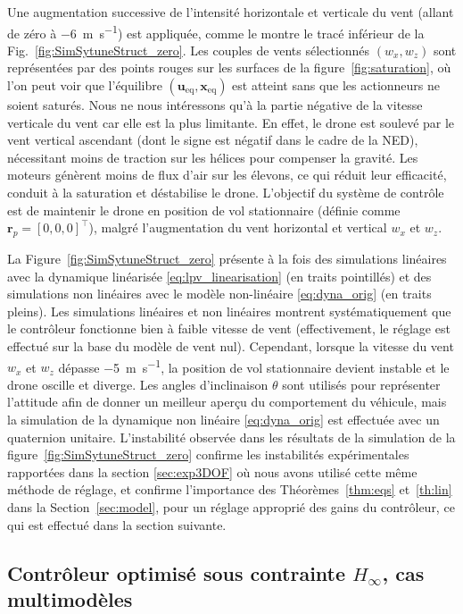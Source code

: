 Une augmentation successive de l'intensité horizontale et verticale du vent (allant de zéro à \SI{-6}{\meter\per\second}) est appliquée, comme le montre le tracé inférieur de la Fig.~\ref{fig:SimSytuneStruct_zero}. Les couples de vents sélectionnés $(w_{x}, w_{z})$ sont représentées par des points rouges sur les surfaces de la figure~\ref{fig:saturation}, où l'on peut voir que l'équilibre $(\boldsymbol{u}_{\text{eq}}, \boldsymbol{x}_{\text{eq}})$ est atteint sans que les actionneurs ne soient saturés. Nous ne nous intéressons qu'à la partie négative de la vitesse verticale du vent car elle est la plus limitante. En effet, le drone est soulevé par le vent vertical ascendant (dont le signe est négatif dans le cadre de la NED), nécessitant moins de traction sur les hélices pour compenser la gravité. Les moteurs génèrent moins de flux d'air sur les élevons, ce qui réduit leur efficacité, conduit à la saturation et déstabilise le drone.
L'objectif du système de contrôle est de maintenir le drone en position de vol stationnaire (définie comme $\boldsymbol{r}_{p} = [0,0,0]^\top$), malgré l'augmentation du vent horizontal et vertical $w_{x}$ et $w_{z}$. 


La Figure~\ref{fig:SimSytuneStruct_zero} présente à la fois des simulations linéaires avec la dynamique linéarisée \eqref{eq:lpv_linearisation} (en traits pointillés) et des simulations non linéaires avec le modèle non-linéaire \eqref{eq:dyna_orig} (en traits pleins). Les simulations linéaires et non linéaires montrent systématiquement que le contrôleur fonctionne bien à faible vitesse de vent (effectivement, le réglage est effectué sur la base du modèle de vent nul). Cependant, lorsque la vitesse du vent $w_{x}$ et $w_{z}$ dépasse \SI{-5}{\meter\per\second}, la position de vol stationnaire devient instable et le drone oscille et diverge. Les angles d'inclinaison $\theta$ sont utilisés pour représenter l'attitude afin de donner un meilleur aperçu du comportement du véhicule, mais la simulation de la dynamique non linéaire \eqref{eq:dyna_orig} est effectuée avec un quaternion unitaire. L'instabilité observée dans les résultats de la simulation de la figure~\ref{fig:SimSytuneStruct_zero} confirme les instabilités expérimentales rapportées dans la section \ref{sec:exp3DOF} où nous avons utilisé cette même méthode de réglage, et confirme l'importance des Théorèmes~\ref{thm:eqs} et~\ref{th:lin} dans la Section~\ref{sec:model}, pour un réglage approprié des gains du contrôleur, ce qui est effectué dans la section suivante.


\subsection{Contrôleur optimisé sous contrainte $H_{\infty}$, cas multimodèles}
\label{sec:h_inf6DOF_multi}

